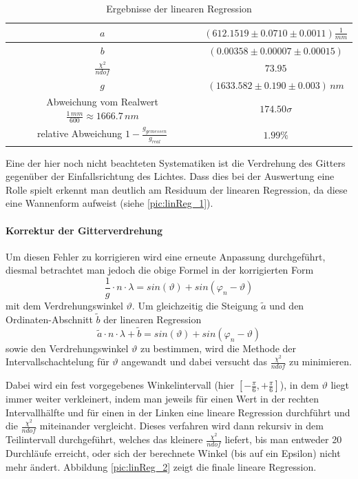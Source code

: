 \documentclass[a4paper, 11pt]{article}
\begin{document}
\begin{table}[H]
	\renewcommand{\arraystretch}{1.5}
	\large
	\centering
	\begin{tabular}{|c|c|}
		\hline
		$a$ &	$(612.1519 \pm 0.0710 \pm 0.0011) \frac{1}{mm}$ \\
		\hline
		$b$	&	$(0.00358 \pm 0.00007 \pm 0.00015) $ \\
		\hline
		$\frac{\chi^2}{ndof}$	&	$73.95$ \\
		\hline
		$g$	&	$(1633.582 \pm 0.190 \pm 0.003) \,nm$ \\
		\hline
		Abweichung vom Realwert $\frac{1 \,mm}{600} \approx	1666.7\, nm$	&	$ 174.50\sigma $ \\
		\hline
		relative Abweichung $1 - \frac{g_{gemessen}}{g_{real}}$ &	$ 1.99 \%$ \\
		\hline
	\end{tabular}
	\caption{Ergebnisse der linearen Regression}
	\label{table: linReg_final}
\end{table}

Eine der hier noch nicht beachteten Systematiken ist die Verdrehung des Gitters gegenüber der Einfallsrichtung des Lichtes. Dass dies bei der Auswertung eine Rolle spielt erkennt man deutlich am Residuum der linearen Regression, da diese eine Wannenform aufweist (siehe \ref{pic:linReg_1}). 

\paragraph{Korrektur der Gitterverdrehung}
Um diesen Fehler zu korrigieren wird eine erneute Anpassung durchgeführt, diesmal betrachtet man jedoch die obige Formel in der korrigierten Form 
\begin{equation}
\frac{1}{g} \cdot n \cdot \lambda = sin(\vartheta) + sin(\varphi_n - \vartheta)
\end{equation}
mit dem Verdrehungswinkel $\vartheta$. Um gleichzeitig die Steigung $\tilde{a}$ und den Ordinaten-Abschnitt $\tilde{b}$ der linearen Regression
\begin{equation}
\tilde{a} \cdot n \cdot \lambda + \tilde{b} = sin(\vartheta) + sin(\varphi_n - \vartheta)
\end{equation}
sowie den Verdrehungswinkel $\vartheta$ zu bestimmen, wird die Methode der Intervallschachtelung für $\vartheta$ angewandt und dabei versucht das $\frac{\chi^2}{ndof}$ zu minimieren.

Dabei wird ein fest vorgegebenes Winkelintervall (hier $\left[ -\frac{\pi}{6}, +\frac{\pi}{6}\right]$), in dem $\vartheta$ liegt immer weiter verkleinert, indem man jeweils für einen Wert in der rechten Intervallhälfte und für einen in der Linken eine lineare Regression durchführt und die $\frac{\chi^2}{ndof}$ miteinander vergleicht. Dieses verfahren wird dann rekursiv in dem Teilintervall durchgeführt, welches das kleinere $\frac{\chi^2}{ndof}$ liefert, bis man entweder 20 Durchläufe erreicht, oder sich der berechnete Winkel (bis auf ein Epsilon) nicht mehr ändert.
Abbildung \ref{pic:linReg_2} zeigt die finale lineare Regression.
\end{document}
